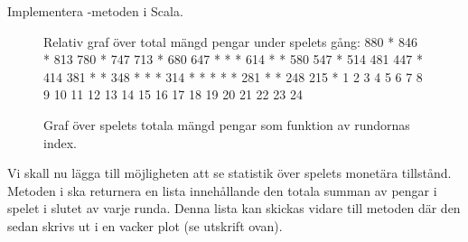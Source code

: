 \Subtask Implementera -metoden i Scala.

\begin{figure}[H]
\centering

\begin{REPL}
Relativ graf över total mängd pengar under spelets gång:
880  *                                                                         
846     *                                                                      
813                                                                            
780        *                                                                   
747                                                                            
713           *                                                                
680                                                                            
647              *  *  *                                                       
614                       *  *                                                 
580                                                                            
547                             *                                              
514                                                                            
481                                                                            
447                                *                                           
414                                                                            
381                                   *  *                                     
348                                         *  *  *                            
314                                                  *  *  *  *  *             
281                                                                 *  *       
248                                                                            
215                                                                       *    
     1  2  3  4  5  6  7  8  9  10 11 12 13 14 15 16 17 18 19 20 21 22 23 24 
\end{REPL}
\caption {Graf över spelets totala mängd pengar som funktion av rundornas index.}
\label{fig:scalajava:lthopoly-team:statistics}
\end{figure}

\Task Vi skall nu lägga till möjligheten att se statistik över spelets monetära tillstånd. Metoden  i  ska returnera en lista innehållande den totala summan av pengar i spelet i slutet av varje runda. Denna lista kan skickas vidare till metoden  där den sedan skrivs ut i en vacker plot (se utskrift ovan).

